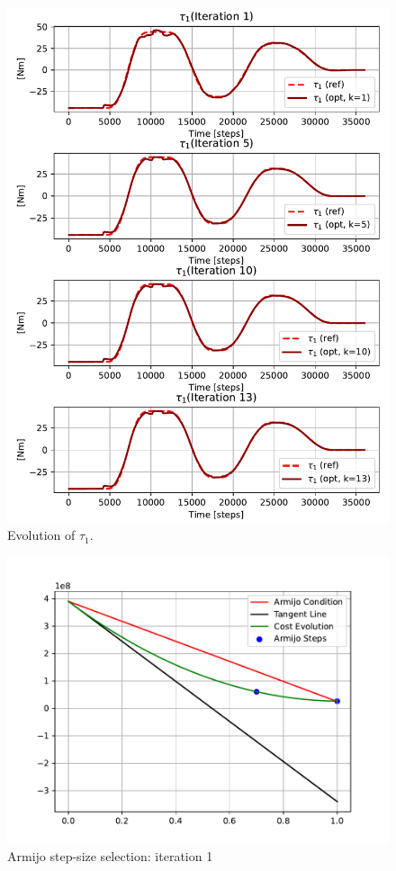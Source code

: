 \begin{figure}[htb]
    \includegraphics[width=1\linewidth]{img/2-task2/tau_evolution.pdf}
    \caption{Evolution of $\tau_1$.}
    \label{fig:tau1-evolution}
\end{figure}

\begin{figure}[htb]
    \centering
    \includegraphics[width=1\linewidth]{img/2-task2/Armijo_iter_1.pdf}
    \caption{Armijo step-size selection: iteration 1}
    \label{fig:armijo1}
\end{figure}

